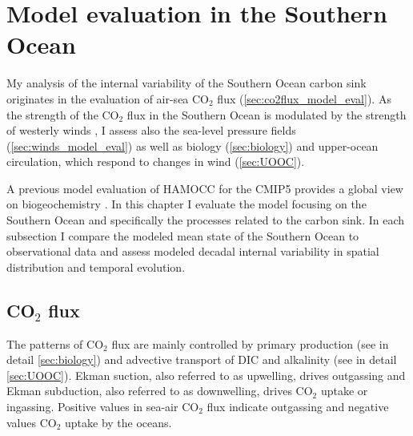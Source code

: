 \chapter{Model evaluation in the Southern Ocean} %

\label{ch:eval}


My analysis of the internal variability of the Southern Ocean carbon sink originates in the evaluation of air-sea CO$_2$ flux (\autoref{sec:co2flux_model_eval}). As the strength of the CO$_2$ flux in the Southern Ocean is modulated by the strength of westerly winds \citep{Lovenduski2007}, I assess also the sea-level pressure fields (\autoref{sec:winds_model_eval}) as well as biology (\autoref{sec:biology}) and upper-ocean circulation, which respond to changes in wind (\autoref{sec:UOOC}).

A previous model evaluation of \acs{HAMOCC} for the \ac{CMIP5} provides a global view on biogeochemistry \citep{Ilyina2013}. In this chapter I evaluate the model focusing on the Southern Ocean and specifically the processes related to the carbon sink. In each subsection I compare the modeled mean state of the Southern Ocean to observational data and assess modeled decadal internal variability in spatial distribution and temporal evolution. 


 

\section{CO$_2$ flux}
\label{sec:co2flux_model_eval}

The patterns of CO$_2$ flux are mainly controlled by primary production (see in detail \autoref{sec:biology}) and advective transport of \acs{DIC} and alkalinity (see in detail \autoref{sec:UOOC}). Ekman suction, also referred to as upwelling, drives outgassing and Ekman subduction, also referred to as downwelling, drives CO$_2$ uptake or ingassing. Positive values in sea-air CO$_2$ flux indicate outgassing and negative values CO$_2$ uptake by the oceans.\newline %

